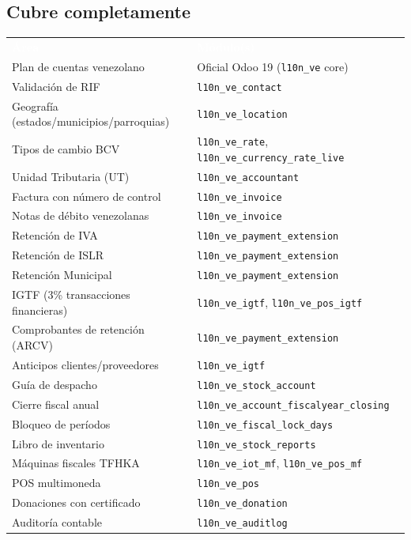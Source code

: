 \documentclass[11pt,a4paper]{article}
\newcommand{\modulo}[1]{\texttt{\textcolor{naranja}{#1}}}
\newcommand{\tchead}[1]{%
  \cellcolor{naranja}\textcolor{white}{\textbf{#1}}%
}
\begin{document}
\begin{Form}
\subsection*{Cubre completamente}

\begin{center}
\begin{tabular}{L{6.0cm} L{8.0cm}}
  \tchead{Área} & \tchead{Módulo(s)} \\
  Plan de cuentas venezolano & Oficial Odoo 19 (\texttt{l10n\_ve} core) \\
  Validación de RIF & \modulo{l10n\_ve\_contact} \\
  Geografía (estados/municipios/parroquias) & \modulo{l10n\_ve\_location} \\
  Tipos de cambio BCV & \modulo{l10n\_ve\_rate}, \modulo{l10n\_ve\_currency\_rate\_live} \\
  Unidad Tributaria (UT) & \modulo{l10n\_ve\_accountant} \\
  Factura con número de control & \modulo{l10n\_ve\_invoice} \\
  Notas de débito venezolanas & \modulo{l10n\_ve\_invoice} \\
  Retención de IVA & \modulo{l10n\_ve\_payment\_extension} \\
  Retención de ISLR & \modulo{l10n\_ve\_payment\_extension} \\
  Retención Municipal & \modulo{l10n\_ve\_payment\_extension} \\
  IGTF (3\% transacciones financieras) & \modulo{l10n\_ve\_igtf}, \modulo{l10n\_ve\_pos\_igtf} \\
  Comprobantes de retención (ARCV) & \modulo{l10n\_ve\_payment\_extension} \\
  Anticipos clientes/proveedores & \modulo{l10n\_ve\_igtf} \\
  Guía de despacho & \modulo{l10n\_ve\_stock\_account} \\
  Cierre fiscal anual & \modulo{l10n\_ve\_account\_fiscalyear\_closing} \\
  Bloqueo de períodos & \modulo{l10n\_ve\_fiscal\_lock\_days} \\
  Libro de inventario & \modulo{l10n\_ve\_stock\_reports} \\
  Máquinas fiscales TFHKA & \modulo{l10n\_ve\_iot\_mf}, \modulo{l10n\_ve\_pos\_mf} \\
  POS multimoneda & \modulo{l10n\_ve\_pos} \\
  Donaciones con certificado & \modulo{l10n\_ve\_donation} \\
  Auditoría contable & \modulo{l10n\_ve\_auditlog} \\
\end{tabular}
\end{center}


\end{Form}
\end{document}
